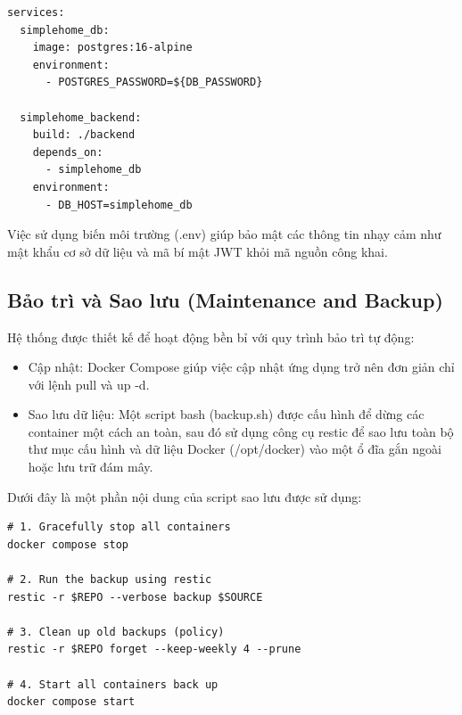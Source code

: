 \begin{verbatim}
services:
  simplehome_db:
    image: postgres:16-alpine
    environment:
      - POSTGRES_PASSWORD=${DB_PASSWORD}
  
  simplehome_backend:
    build: ./backend
    depends_on:
      - simplehome_db
    environment:
      - DB_HOST=simplehome_db
\end{verbatim}

Việc sử dụng biến môi trường (.env) giúp bảo mật các thông tin nhạy cảm như mật khẩu cơ sở dữ liệu và mã bí mật JWT khỏi mã nguồn công khai.

\subsection{Bảo trì và Sao lưu (Maintenance and Backup)}
Hệ thống được thiết kế để hoạt động bền bỉ với quy trình bảo trì tự động:
\begin{itemize}
    \item Cập nhật: Docker Compose giúp việc cập nhật ứng dụng trở nên đơn giản chỉ với lệnh pull và up -d.
    \item Sao lưu dữ liệu: Một script bash (backup.sh) được cấu hình để dừng các container một cách an toàn, sau đó sử dụng công cụ restic để sao lưu toàn bộ thư mục cấu hình và dữ liệu Docker (/opt/docker) vào một ổ đĩa gắn ngoài hoặc lưu trữ đám mây.
\end{itemize}

Dưới đây là một phần nội dung của script sao lưu được sử dụng:
\begin{verbatim}
# 1. Gracefully stop all containers
docker compose stop

# 2. Run the backup using restic
restic -r $REPO --verbose backup $SOURCE

# 3. Clean up old backups (policy)
restic -r $REPO forget --keep-weekly 4 --prune

# 4. Start all containers back up
docker compose start
\end{verbatim}
